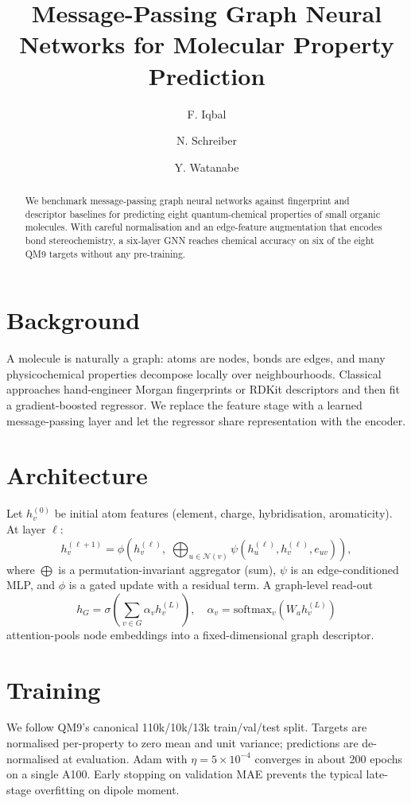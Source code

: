 \documentclass[11pt]{article}
\title{Message-Passing Graph Neural Networks for Molecular Property Prediction}
\author{F. Iqbal \and N. Schreiber \and Y. Watanabe}
\date{}
\begin{document}
\maketitle

\begin{abstract}
We benchmark message-passing graph neural networks against fingerprint and
descriptor baselines for predicting eight quantum-chemical properties of
small organic molecules. With careful normalisation and an edge-feature
augmentation that encodes bond stereochemistry, a six-layer GNN reaches
chemical accuracy on six of the eight QM9 targets without any pre-training.
\end{abstract}

\section{Background}
A molecule is naturally a graph: atoms are nodes, bonds are edges, and many
physicochemical properties decompose locally over neighbourhoods. Classical
approaches hand-engineer Morgan fingerprints or RDKit descriptors and then
fit a gradient-boosted regressor. We replace the feature stage with a learned
message-passing layer and let the regressor share representation with the
encoder.

\section{Architecture}
Let $h_v^{(0)}$ be initial atom features (element, charge, hybridisation,
aromaticity). At layer $\ell$:
\begin{equation}
h_v^{(\ell+1)} = \phi\!\left( h_v^{(\ell)},\; \bigoplus_{u \in \mathcal{N}(v)}
  \psi(h_u^{(\ell)}, h_v^{(\ell)}, e_{uv}) \right),
\end{equation}
where $\bigoplus$ is a permutation-invariant aggregator (sum), $\psi$ is an
edge-conditioned MLP, and $\phi$ is a gated update with a residual term.
A graph-level read-out
\begin{equation}
h_G = \sigma\!\left(\sum_{v \in G} \alpha_v h_v^{(L)}\right),\quad
\alpha_v = \mathrm{softmax}_v(W_a h_v^{(L)})
\end{equation}
attention-pools node embeddings into a fixed-dimensional graph descriptor.

\section{Training}
We follow QM9's canonical 110k/10k/13k train/val/test split. Targets are
normalised per-property to zero mean and unit variance; predictions are
de-normalised at evaluation. Adam with $\eta = 5\times10^{-4}$ converges in
about 200 epochs on a single A100. Early stopping on validation MAE prevents
the typical late-stage overfitting on dipole moment.
\end{document}
